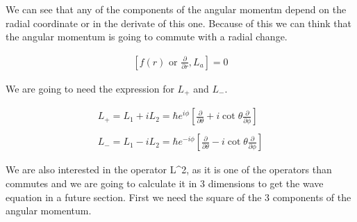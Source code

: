 We can see that any of the components of the angular momentm depend on the radial coordinate or in the derivate of this one. Because of this we can think that the angular momentum is going to commute with a radial change.

\begin{equation}
  \begin{array}{c}
    [f(r) \text{ or } \frac{\partial}{\partial r},L_a] = 0
  \end{array}
\end{equation}

We are going to need the expression for $L_+$ and $L_-$.

\begin{equation}
  \begin{array}{c}
    L_+ = L_1 + iL_2 = \hbar e^{i\phi}\left[\frac{\partial}{\partial\theta}+i\cot\theta\frac{\partial}{\partial\phi}\right]
    \\

    \\
    L_- = L_1 - iL_2 = \hbar e^{-i\phi}\left[\frac{\partial}{\partial\theta}-i\cot\theta\frac{\partial}{\partial\phi}\right]
  \end{array}
\end{equation}

We are also interested in the operator L^2, as it is one of the operators than commutes and we are going to calculate it in 3 dimensions to get the wave equation in a future section. First we need the square of the 3 components of the angular momentum.

